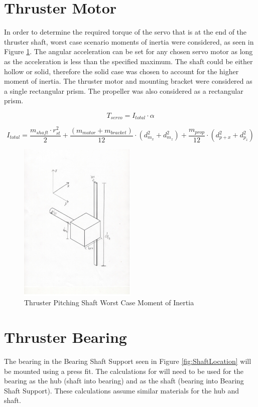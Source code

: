 \documentclass[../main.tex]{subfiles}
\begin{document}
\section{Thruster Motor}
In order to determine the required torque of the servo that is at the end  of the thruster shaft, worst case scenario moments of inertia were considered, as seen in Figure \ref{fig:ThrusterI}. The angular acceleration can be set for any chosen servo motor as long as the acceleration is less than the specified maximum. The shaft could be either hollow or solid, therefore the solid case was chosen to account for the higher moment of inertia. The thruster motor and mounting bracket were considered as a single rectangular prism. The propeller was also considered as a rectangular prism.

\begin{equation}
T_{servo} = I_{total}\cdot{}\alpha
\end{equation}

\begin{equation}
I_{total} = \frac{m_{shaft}\cdot{}r_{st}^2}{2} + \frac{(m_{motor} + m_{bracket})}{12} \cdot{}(d_{m_{x}}^2 + d_{m_{z}}^2) + \frac{m_{prop}}{12}\cdot{}(d_{p+{x}}^2 + d_{p_{z}}^2)
\end{equation}

\begin{figure}[H]
	\centering
	\includegraphics[width=0.5\textwidth]{img/analysis/thruster/thruster1.pdf}
	\caption{Thruster Pitching Shaft Worst Case Moment of Inertia}
	\label{fig:ThrusterI}
\end{figure}

\section{Thruster Bearing}
The bearing in the Bearing Shaft Support seen in Figure \ref{fig:ShaftLocation} will be mounted using a press fit. The calculations \cite{pressfit} for will need to be used for the bearing as the hub (shaft into bearing) and as the shaft (bearing into Bearing Shaft Support). These calculations assume similar materials for the hub and shaft.
\end{document}
